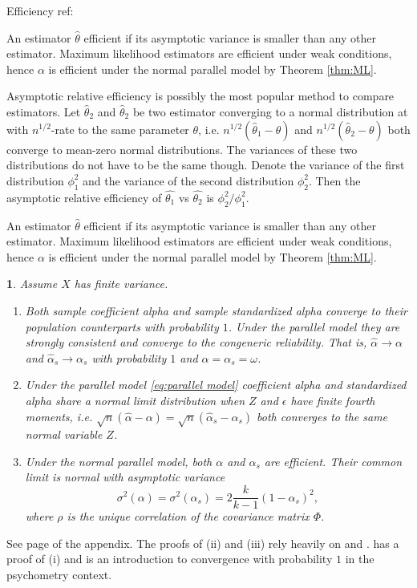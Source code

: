 \documentclass{article}
\makeatletter
\theoremstyle{plain}
\newtheorem{thm}{\protect\theoremname}
\theoremstyle{plain}
\theoremstyle{definition}
\theoremstyle{remark}
\theoremstyle{definition}
\theoremstyle{plain}
\theoremstyle{plain}
\theoremstyle{definition}
\newenvironment{proof}[1][\protect\proofname]{\par
	\normalfont\topsep6\p@\@plus6\p@\relax
	\trivlist
	\itemindent\parindent
	\item[\hskip\labelsep\scshape #1]\ignorespaces
}{%
	\endtrivlist\@endpefalse
}
\providecommand{\proofname}{Proof}
\providecommand{\theoremname}{Theorem}
\makeatother
\begin{document}
Efficiency ref: \citep[][Section 4.3]{Lehmann2004-ke}

An estimator $\widehat{\theta}$ efficient if its asymptotic variance is smaller than any other estimator. Maximum likelihood estimators are efficient under weak conditions, hence $\alpha$ is efficient under the normal parallel model by Theorem \ref{thm:ML}.

Asymptotic relative efficiency is possibly the most popular method to compare estimators. Let $\widehat{\theta}_2$ and $\widehat{\theta}_2$ be two estimator converging to a normal distribution at with $n^{1/2}$-rate to the same parameter $\theta$, i.e. 
$n^{1/2}{(\widehat{\theta}_1 - \theta)}$ and $n^{1/2}{(\widehat{\theta}_2 - \theta)}$ both converge to mean-zero normal distributions. The variances of these two distributions do not have to be the same though. Denote the variance of the first distribution $\phi_1^2$ and the variance of the second distribution $\phi_2^2$. Then the asymptotic relative efficiency of $\widehat{\theta_1}$ vs $\widehat{\theta_2}$ is $\phi_2^2/\phi_1^2$.

An estimator $\widehat{\theta}$ efficient if its asymptotic variance is smaller than any other estimator. Maximum likelihood estimators are efficient under weak conditions, hence $\alpha$ is efficient under the normal parallel model by Theorem \ref{thm:ML}.

\begin{thm}
\label{thm:asymptotics}
Assume $X$ has finite variance. 
\begin{enumerate}[label=(\roman*)]
    \item Both sample coefficient alpha and sample standardized alpha converge to their population counterparts with probability $1$. Under the parallel model they are strongly consistent and converge to the congeneric reliability. That is, $\widehat{\alpha}\to\alpha$ and $\widehat{\alpha}_s\to\alpha_s$ with probability $1$ and $\alpha = \alpha_s = \omega$.
    \item Under the parallel model \eqref{eq:parallel model} coefficient alpha and standardized alpha share a normal limit distribution when $Z$ and $\epsilon$ have finite fourth moments, i.e. $\sqrt{n}(\widehat{\alpha} - \alpha) = \sqrt{n}(\widehat{\alpha}_s - \alpha_s)$ both converges to the same normal variable $Z$.
    \item Under the normal parallel model, both $\alpha$ and $\alpha_s$ are efficient. Their common limit is normal with asymptotic variance 
    $$\sigma^{2}\left(\alpha\right)= \sigma^{2}\left(\alpha_{s}\right)=2\frac{k}{k-1}\left(1-\alpha_{s}\right)^{2},$$
    where $\rho$ is the unique correlation of the covariance matrix $\Phi$.
\end{enumerate}
\end{thm}    
\begin{proof}
See page \pageref{proof:asymptotics} of the appendix. The proofs of (ii) and (iii) rely heavily on \citep{Van_Zyl2000-si} and \citep{hayashi2005note}. \citep{Raykov2019-tv} has a proof of (i) and is an introduction to convergence with probability $1$ in the psychometry context.
\end{proof}
\end{document}
